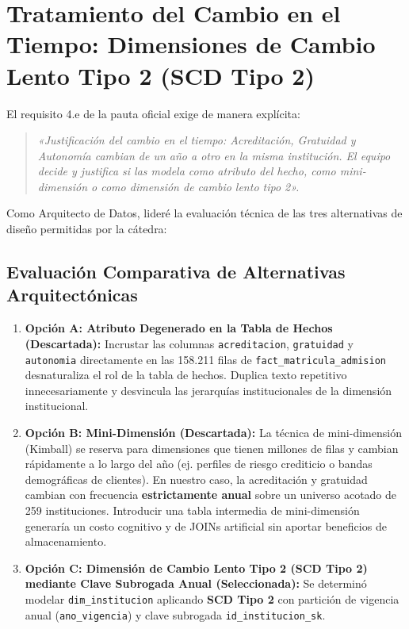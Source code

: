 \documentclass[11pt,a4paper]{article}
\begin{document}
\section{Tratamiento del Cambio en el Tiempo: Dimensiones de Cambio Lento Tipo 2 (SCD Tipo 2)}
\label{sec:scd}

El requisito 4.e de la pauta oficial exige de manera explícita:
\begin{quote}
\textit{«Justificación del cambio en el tiempo: Acreditación, Gratuidad y Autonomía cambian de un año a otro en la misma institución. El equipo decide y justifica si las modela como atributo del hecho, como mini-dimensión o como dimensión de cambio lento tipo 2».}
\end{quote}

Como Arquitecto de Datos, lideré la evaluación técnica de las tres alternativas de diseño permitidas por la cátedra:

\subsection{Evaluación Comparativa de Alternativas Arquitectónicas}
\begin{enumerate}[leftmargin=*]
    \item \textbf{Opción A: Atributo Degenerado en la Tabla de Hechos (Descartada):}  
    Incrustar las columnas \texttt{acreditacion}, \texttt{gratuidad} y \texttt{autonomia} directamente en las 158.211 filas de \texttt{fact\_matricula\_admision} desnaturaliza el rol de la tabla de hechos. Duplica texto repetitivo innecesariamente y desvincula las jerarquías institucionales de la dimensión institucional.
    
    \item \textbf{Opción B: Mini-Dimensión (Descartada):}  
    La técnica de mini-dimensión (Kimball) se reserva para dimensiones que tienen millones de filas y cambian rápidamente a lo largo del año (ej. perfiles de riesgo crediticio o bandas demográficas de clientes). En nuestro caso, la acreditación y gratuidad cambian con frecuencia \textbf{estrictamente anual} sobre un universo acotado de 259 instituciones. Introducir una tabla intermedia de mini-dimensión generaría un costo cognitivo y de JOINs artificial sin aportar beneficios de almacenamiento.

    \item \textbf{Opción C: Dimensión de Cambio Lento Tipo 2 (SCD Tipo 2) mediante Clave Subrogada Anual (Seleccionada):}  
    Se determinó modelar \texttt{dim\_institucion} aplicando \textbf{SCD Tipo 2} con partición de vigencia anual (\texttt{ano\_vigencia}) y clave subrogada \texttt{id\_institucion\_sk}.
\end{enumerate}
\end{document}
